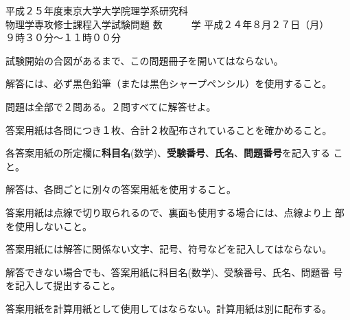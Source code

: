 \begin{inshicover}%
  {平成２５年度東京大学大学院理学系研究科\\物理学専攻修士課程入学試験問題}%
  {数　　　学}%
  {平成２４年８月２７日（月）　　９時３０分〜１１時００分}
\item 試験開始の合図があるまで、この問題冊子を開いてはならない。
\item 解答には、必ず黒色鉛筆（または黒色シャープペンシル）を使用すること。
\item 問題は全部で２問ある。２問すべてに解答せよ。
\item 答案用紙は各問につき１枚、合計２枚配布されていることを確かめること。
\item 各答案用紙の所定欄に{\bf 科目名}(数学)、{\bf 受験番号}、{\bf 氏名}、{\bf 問題番号}を記入する
      こと。
\item 解答は、各問ごとに別々の答案用紙を使用すること。
\item 答案用紙は点線で切り取られるので、裏面も使用する場合には、点線より上
      部を使用しないこと。
\item 答案用紙には解答に関係ない文字、記号、符号などを記入してはならない。
\item 解答できない場合でも、答案用紙に科目名(数学)、受験番号、氏名、問題番
      号を記入して提出すること。
\item 答案用紙を計算用紙として使用してはならない。計算用紙は別に配布する。
\end{inshicover}
